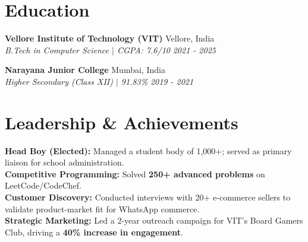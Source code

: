 \documentclass[a4paper,10pt]{article}
\begin{document}
\section*{Education}

\textbf{Vellore Institute of Technology (VIT)} \hfill Vellore, India \\
\textit{B.Tech in Computer Science $|$ CGPA: 7.6/10} \hfill \textit{2021 - 2025}

\vspace{2pt}

\textbf{Narayana Junior College} \hfill Mumbai, India \\
\textit{Higher Secondary (Class XII) $|$ 91.83\%} \hfill \textit{2019 - 2021}

\section*{Leadership \& Achievements}

\textbf{Head Boy (Elected):} Managed a student body of 1,000+; served as primary liaison for school administration. \\
\textbf{Competitive Programming:} Solved \textbf{250+ advanced problems} on LeetCode/CodeChef. \\
\textbf{Customer Discovery:} Conducted interviews with 20+ e-commerce sellers to validate product-market fit for WhatsApp commerce. \\
\textbf{Strategic Marketing:} Led a 2-year outreach campaign for VIT's Board Gamers Club, driving a \textbf{40\% increase in engagement}.
\end{document}
